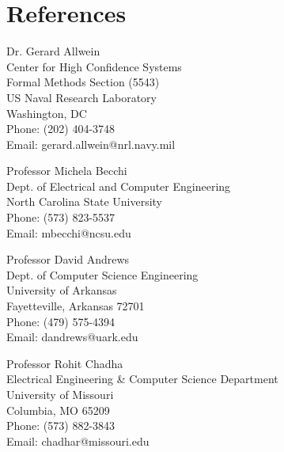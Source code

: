 \documentclass[12pt]{article} %
\begin{document}

\newpage
\section*{References}
\vspace{1ex}

\begin{minipage}[t]{3.1in}
\begin{flushleft}
Dr. Gerard Allwein\\
Center for High Confidence Systems\\
Formal Methods Section (5543)\\
US Naval Research Laboratory\\ 
Washington, DC  \\
Phone: (202) 404-3748 \\
Email: gerard.allwein@nrl.navy.mil
\end{flushleft}
\end{minipage}
\begin{minipage}[t]{3.1in}
\begin{flushleft}
Professor Michela Becchi\\
Dept. of Electrical and Computer Engineering\\
North Carolina State University\\
Phone: (573) 823-5537\\
Email: mbecchi@ncsu.edu
\end{flushleft}
\end{minipage}

\vspace{3ex}

\begin{minipage}[t]{3.1in}
\begin{flushleft}
Professor David Andrews\\
Dept. of Computer Science Engineering \\
University of Arkansas\\ 
Fayetteville, Arkansas 72701 \\
Phone: (479) 575-4394 \\
Email: dandrews@uark.edu
\end{flushleft}
\end{minipage}
\begin{minipage}[t]{3.1in}
\begin{flushleft}
Professor Rohit Chadha\\
Electrical Engineering \& Computer Science Department \\
University of Missouri\\
Columbia, MO 65209\\
Phone:  (573) 882-3843 \\
Email: chadhar@missouri.edu
\end{flushleft}
\end{minipage}
\end{document}
